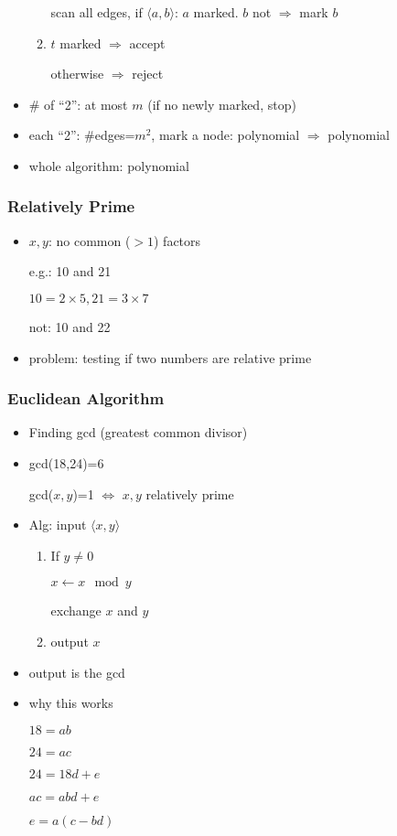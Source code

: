\begin{frame}[allowframebreaks]
\begin{itemize}
\begin{enumerate}
scan all edges, if $\langle  a,b\rangle $: $a$ marked. $b$ not
$\Rightarrow $ mark $b$
\item $t$ marked $\Rightarrow$ accept

otherwise $\Rightarrow$ reject
\end{enumerate}
\item \# of ``2'': at most $m$ (if no newly marked, stop)
\item each ``2'': \#edges=$m^2$, mark a node: polynomial
$\Rightarrow$ polynomial
\item whole algorithm: polynomial
\end{itemize}\end{frame} \begin{frame}[allowframebreaks] \frametitle{Relatively Prime}
  \begin{itemize}
\item $x,y$: no common ($> 1$) factors

e.g.: 10 and 21

$10=2 \times 5, 21
=3\times 7$

not: 10 and 22
\item problem: testing if two numbers are relative
prime
\end{itemize}\end{frame} \begin{frame}[allowframebreaks] \frametitle{Euclidean Algorithm}
  \begin{itemize}
\item Finding gcd (greatest common divisor)
\item gcd(18,24)=6

gcd($x,y$)=1
$\Leftrightarrow$ $x,y$ relatively prime

\item Alg: input $\langle  x,y\rangle $
  \begin{enumerate}
  \item If $y \neq 0$

$x \leftarrow x \mod y$

exchange $x$ and $y$
\item output $x$
  \end{enumerate}
\item output is the gcd
\item why this works

$18=ab$

$24=ac$

$24 = 18d + e$

$ac=abd + e$

$e = a (c-bd)$


\end{itemize}
\end{frame}
